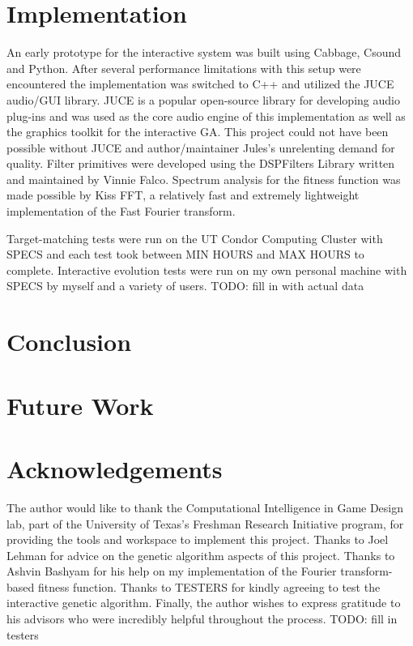 \documentclass[12pt]{article}
\begin{document}
\section{Implementation}
An early prototype for the interactive system was built using Cabbage, Csound and Python. After several performance limitations with this setup were encountered the implementation was switched to C++ and utilized the JUCE audio/GUI library. JUCE is a popular open-source library for developing audio plug-ins and was used as the core audio engine of this implementation as well as the graphics toolkit for the interactive GA. This project could not have been possible without JUCE and author/maintainer Jules's unrelenting demand for quality. Filter primitives were developed using the DSPFilters Library written and maintained by Vinnie Falco. Spectrum analysis for the fitness function was made possible by Kiss FFT, a relatively fast and extremely lightweight implementation of the Fast Fourier transform.
	
Target-matching tests were run on the UT Condor Computing Cluster with SPECS and each test took between MIN HOURS and MAX HOURS to complete. Interactive evolution tests were run on my own personal machine with SPECS by myself and a variety of users. TODO: fill in with actual data

\section{Conclusion}

\section{Future Work}

\section{Acknowledgements}
The author would like to thank the Computational Intelligence in Game Design lab, part of the University of Texas's Freshman Research Initiative program, for providing the tools and workspace to implement this project. Thanks to Joel Lehman for advice on the genetic algorithm aspects of this project. Thanks to Ashvin Bashyam for his help on my implementation of the Fourier transform-based fitness function. Thanks to TESTERS for kindly agreeing to test the interactive genetic algorithm. Finally, the author wishes to express gratitude to his advisors who were incredibly helpful throughout the process. TODO: fill in testers
\end{document}
